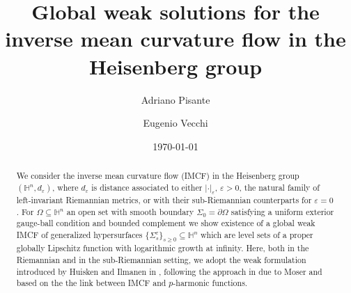 \documentclass[10pt]{amsart}
\date{\today}
\numberwithin{equation}{section}
\theoremstyle{definition}
\newcommand{\He}{\mathbb{H}}
\begin{document}
\title[IMCF in the Heisenberg group]{Global weak solutions for the inverse mean curvature flow in the Heisenberg group}
%
\author[A.\ Pisante]{Adriano Pisante}
\author[E.\ Vecchi]{Eugenio Vecchi}

\address[A.\,Pisante]{Dipartimento di Matematica Guido Castelnuovo
 \newline\indent Sapienza Universit\`a di Roma \newline\indent
 Piazzale Aldo Moro 5, 00185 Roma, Italy}

 \address[E.\,Vecchi]{Dipartimento di Matematica
 \newline\indent Universit\`a di Bologna \newline\indent
 Piazza di Porta San Donato 5, 40126 Bologna, Italy}







%
\begin{abstract}
We consider the inverse mean curvature flow (IMCF) in the Heisenberg group $(\He^n, d_\varepsilon)$, where $d_\varepsilon$ is distance associated to either $| \cdot |_\varepsilon$, $\varepsilon>0$, the natural family of left-invariant Riemannian metrics, or with their sub-Riemannian counterparts for $\varepsilon=0$. For $\Omega \subseteq \He^n$ an open set with smooth boundary $\Sigma_0=\partial \Omega$ satisfying a uniform exterior gauge-ball condition and bounded complement we show existence of a global weak IMCF of generalized hypersurfaces $\{\Sigma^\varepsilon_s\}_{s \geq 0} \subseteq \mathbb{H}^n$ which are level sets of a proper globally Lipschitz function with logarithmic growth at infinity. Here, both in the Riemannian and in the sub-Riemannian setting, we adopt the weak formulation introduced by Huisken and Ilmanen in \cite{HuiskenIlmanen}, following the approach in \cite{Moser} due to Moser and based on the the link between IMCF and $p$-harmonic functions.  
\end{abstract}  
%
\maketitle
\end{document}
